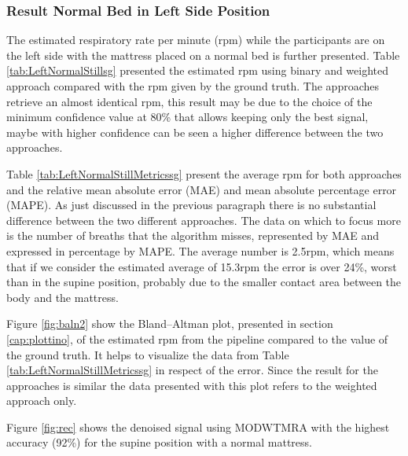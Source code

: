 \subsubsection{Result Normal Bed in Left Side Position}   

The estimated respiratory rate per minute (rpm) while the participants are on the left side with the mattress placed on a normal bed is further presented. Table \ref{tab:LeftNormalStillsg} presented the estimated rpm using binary and weighted approach compared with the rpm given by the ground truth. The approaches retrieve an almost identical rpm, this result may be due to the choice of the minimum confidence value at 80\% that allows keeping only the best signal, maybe with higher confidence can be seen a higher difference between the two approaches. 

\vspace{1.3cm}
%


\vspace{0.5cm}

Table \ref{tab:LeftNormalStillMetricssg} present the average rpm for both approaches  
and the relative mean absolute error (MAE) and mean absolute percentage error (MAPE). As just discussed in the previous paragraph there is no substantial difference between the two different approaches. The data on which to focus more is the number of breaths that the algorithm misses, represented by MAE and expressed in percentage by MAPE. The average number is 2.5rpm, which means that if we consider the estimated average of 15.3rpm the error is over 24\%, worst than in the supine position, probably due to the smaller contact area between the body and the mattress.

\vspace{1cm}

\vspace{0.5cm}

Figure \ref{fig:baln2} show the Bland–Altman plot, presented in section \ref{cap:plottino}, of the estimated rpm from the pipeline compared to the value of the ground truth. It helps to visualize the data from Table \ref{tab:LeftNormalStillMetricssg} in respect of the error. Since the result for the approaches is similar the data presented with this plot refers to the weighted approach only.

Figure \ref{fig:rec} shows the denoised signal using MODWTMRA with the highest accuracy (92\%) for the supine position with a normal mattress.

